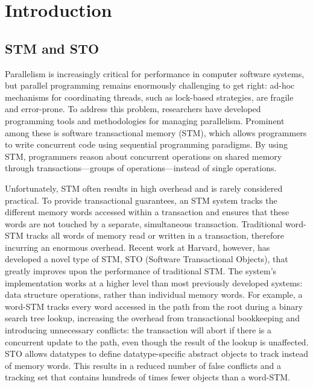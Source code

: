 \chapter{Introduction}
\section{STM and STO}
Parallelism is increasingly critical for performance in computer software systems, but parallel programming remains enormously challenging to get right: ad-hoc mechanisms for coordinating threads, such as lock-based strategies, are fragile and error-prone. To address this problem, researchers have developed programming tools and methodologies for managing parallelism. Prominent among these is software transactional memory (STM), which allows programmers to write concurrent code using sequential programming paradigms. By using STM, programmers reason about concurrent operations on shared memory through transactions---groups of operations---instead of single operations. 

Unfortunately, STM often results in high overhead and is rarely considered practical. To provide transactional guarantees, an STM system tracks the different memory words accessed within a transaction and ensures that these words are not touched by a separate, simultaneous transaction. Traditional word-STM tracks all words of memory read or written in a transaction, therefore incurring an enormous overhead\cite{cascaval}. Recent work at Harvard, however, has developed a novel type of STM, STO (Software Transactional Objects), that greatly improves upon the performance of traditional STM\cite{sto}. The system's implementation works at a higher level than most previously developed systems: data structure operations, rather than individual memory words. For example, a word-STM tracks every word accessed in the path from the root during a binary search tree lookup, increasing the overhead from transactional bookkeeping and introducing unnecessary conflicts: the transaction will abort if there is a concurrent update to the path, even though the result of the lookup is unaffected. STO allows datatypes to define datatype-specific abstract objects to track instead of memory words. This results in a reduced number of false conflicts and a tracking set that contains hundreds of times fewer objects than a word-STM. 

